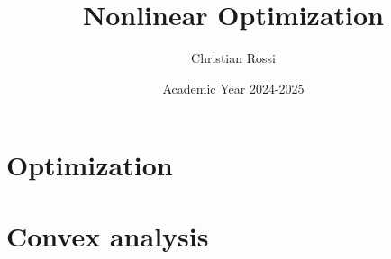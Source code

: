 \documentclass[12pt, a4paper]{report}
\title{\textbf{Nonlinear Optimization}}
\author{Christian Rossi}
\date{Academic Year 2024-2025}
\begin{document}
    \maketitle

    

    \cleardoublepage{}

    \tableofcontents

    \cleardoublepage{}

    \chapter{Optimization}
    
    

    \chapter{Convex analysis}
    
    
    
\end{document}
